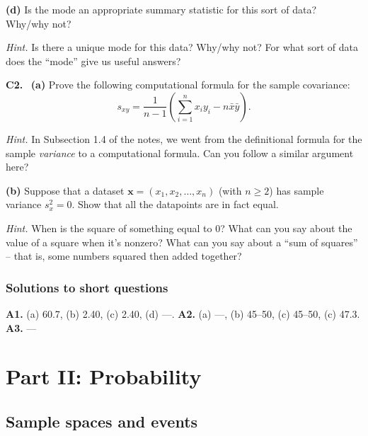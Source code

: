 \documentclass[
  a4paper,
]{book}
\theoremstyle{definition}
\theoremstyle{definition}
\theoremstyle{definition}
\theoremstyle{definition}
\theoremstyle{remark}
\begin{document}
\textbf{(d)} Is the mode an appropriate summary statistic for this sort of data? Why/why not?

\begin{myanswers}
\emph{Hint.}
Is there a unique mode for this data? Why/why not? For what sort of data does the ``mode'' give us useful answers?

\end{myanswers}

\textbf{C2.}
~\textbf{(a)} Prove the following computational formula for the sample covariance:
\[ s_{xy} = \frac{1}{n-1} \left( \sum_{i=1}^n x_iy_i - n\bar x \bar y \right). \]

\begin{myanswers}
\emph{Hint.}
In Subsection 1.4 of the notes, we went from the definitional formula for the sample \emph{variance} to a computational formula. Can you follow a similar argument here?

\end{myanswers}

\textbf{(b)} Suppose that a dataset \(\mathbf x = (x_1, x_2, \dots, x_n)\) (with \(n \geq 2\)) has sample variance \(s_x^2 = 0\). Show that all the datapoints are in fact equal.

\begin{myanswers}
\emph{Hint.}
When is the square of something equal to 0? What can you say about the value of a square when it's nonzero? What can you say about a ``sum of squares'' -- that is, some numbers squared then added together?

\end{myanswers}

\hypertarget{P1-short-sols}{%
\section*{Solutions to short questions}\label{P1-short-sols}}

\textbf{A1.} (a) 60.7, (b) 2.40, (c) 2.40, (d) ---. \textbf{A2.} (a) ---, (b) 45--50, (c) 45--50, (c) 47.3. \textbf{A3.} ---

\hypertarget{part-part-ii-probability}{%
\part*{Part II: Probability}\label{part-part-ii-probability}}

\hypertarget{L03-events}{%
\chapter{Sample spaces and events}\label{L03-events}}
\end{document}

